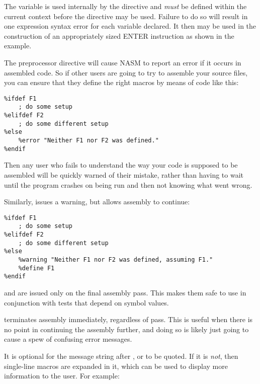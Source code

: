 The  variable is used internally by the
 directive and \emph{must} be defined within the
current context before the  directive may be used.
Failure to do so will result in one expression syntax error for
each  variable declared. It then may be used in
the construction of an appropriately sized ENTER instruction
as shown in the example.


The preprocessor directive  will cause NASM to report an
error if it occurs in assembled code. So if other users are going to
try to assemble your source files, you can ensure that they define the
right macros by means of code like this:

\begin{lstlisting}
%ifdef F1
    ; do some setup
%elifdef F2
    ; do some different setup
%else
    %error "Neither F1 nor F2 was defined."
%endif
\end{lstlisting}

Then any user who fails to understand the way your code is supposed
to be assembled will be quickly warned of their mistake, rather than
having to wait until the program crashes on being run and then not
knowing what went wrong.

Similarly,  issues a warning, but allows assembly to continue:

\begin{lstlisting}
%ifdef F1
    ; do some setup
%elifdef F2
    ; do some different setup
%else
    %warning "Neither F1 nor F2 was defined, assuming F1."
    %define F1
%endif
\end{lstlisting}

 and  are issued only on the final assembly
pass. This makes them safe to use in conjunction with tests that
depend on symbol values.

 terminates assembly immediately, regardless of pass. This
is useful when there is no point in continuing the assembly further,
and doing so is likely just going to cause a spew of confusing error
messages.

It is optional for the message string after , 
or  to be quoted. If it is \emph{not}, then single-line macros
are expanded in it, which can be used to display more information to
the user. For example:

